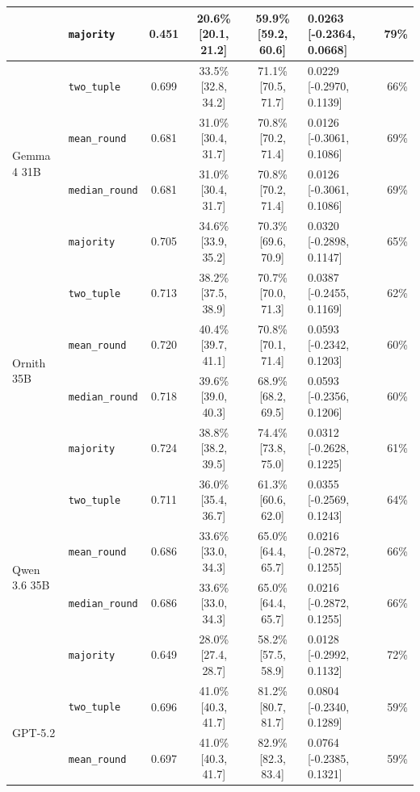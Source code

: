 \begin{table}[htbp]
\begin{tabular}{llccclr}
   & \texttt{majority} & 0.451 & 20.6\% \tiny[20.1, 21.2] & 59.9\% \tiny[59.2, 60.6] & 0.0263 [-0.2364, 0.0668] & 79\% \\
\midrule
  \multirow{4}{*}{Gemma 4 31B} & \texttt{two\_tuple} & 0.699 & 33.5\% \tiny[32.8, 34.2] & 71.1\% \tiny[70.5, 71.7] & 0.0229 [-0.2970, 0.1139] & 66\% \\
   & \texttt{mean\_round} & 0.681 & 31.0\% \tiny[30.4, 31.7] & 70.8\% \tiny[70.2, 71.4] & 0.0126 [-0.3061, 0.1086] & 69\% \\
   & \texttt{median\_round} & 0.681 & 31.0\% \tiny[30.4, 31.7] & 70.8\% \tiny[70.2, 71.4] & 0.0126 [-0.3061, 0.1086] & 69\% \\
   & \texttt{majority} & 0.705 & 34.6\% \tiny[33.9, 35.2] & 70.3\% \tiny[69.6, 70.9] & 0.0320 [-0.2898, 0.1147] & 65\% \\
\midrule
  \multirow{4}{*}{Ornith 35B} & \texttt{two\_tuple} & 0.713 & 38.2\% \tiny[37.5, 38.9] & 70.7\% \tiny[70.0, 71.3] & 0.0387 [-0.2455, 0.1169] & 62\% \\
   & \texttt{mean\_round} & 0.720 & 40.4\% \tiny[39.7, 41.1] & 70.8\% \tiny[70.1, 71.4] & 0.0593 [-0.2342, 0.1203] & 60\% \\
   & \texttt{median\_round} & 0.718 & 39.6\% \tiny[39.0, 40.3] & 68.9\% \tiny[68.2, 69.5] & 0.0593 [-0.2356, 0.1206] & 60\% \\
   & \texttt{majority} & 0.724 & 38.8\% \tiny[38.2, 39.5] & 74.4\% \tiny[73.8, 75.0] & 0.0312 [-0.2628, 0.1225] & 61\% \\
\midrule
  \multirow{4}{*}{Qwen 3.6 35B} & \texttt{two\_tuple} & 0.711 & 36.0\% \tiny[35.4, 36.7] & 61.3\% \tiny[60.6, 62.0] & 0.0355 [-0.2569, 0.1243] & 64\% \\
   & \texttt{mean\_round} & 0.686 & 33.6\% \tiny[33.0, 34.3] & 65.0\% \tiny[64.4, 65.7] & 0.0216 [-0.2872, 0.1255] & 66\% \\
   & \texttt{median\_round} & 0.686 & 33.6\% \tiny[33.0, 34.3] & 65.0\% \tiny[64.4, 65.7] & 0.0216 [-0.2872, 0.1255] & 66\% \\
   & \texttt{majority} & 0.649 & 28.0\% \tiny[27.4, 28.7] & 58.2\% \tiny[57.5, 58.9] & 0.0128 [-0.2992, 0.1132] & 72\% \\
\midrule
  \multirow{4}{*}{GPT-5.2} & \texttt{two\_tuple} & 0.696 & 41.0\% \tiny[40.3, 41.7] & 81.2\% \tiny[80.7, 81.7] & 0.0804 [-0.2340, 0.1289] & 59\% \\
   & \texttt{mean\_round} & 0.697 & 41.0\% \tiny[40.3, 41.7] & 82.9\% \tiny[82.3, 83.4] & 0.0764 [-0.2385, 0.1321] & 59\% \\

\end{tabular}
\end{table}
